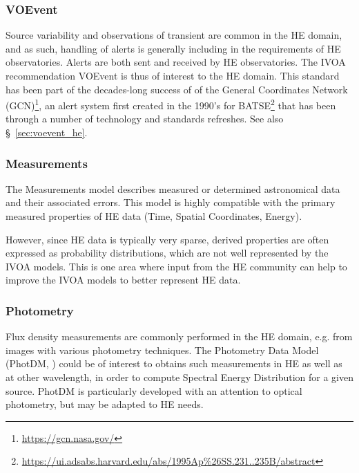 \documentclass[11pt,a4paper]{ivoa}
\begin{document}
{\subsubsection{VOEvent}

Source variability and observations of transient are common in the \gls{HE} domain, and as such, handling of alerts is generally including in the requirements of \gls{HE} observatories. Alerts are both sent and received by \gls{HE} observatories. The \gls{IVOA} recommendation VOEvent \citep{2017ivoa.spec.0320S} is thus of interest to the \gls{HE} domain.  This standard has been part of the decades-long success of of the General Coordinates Network (GCN)\footnote{\url{https://gcn.nasa.gov/}}, an alert system first created in the 1990's for BATSE\footnote{\url{https://ui.adsabs.harvard.edu/abs/1995Ap\%26SS.231..235B/abstract}} that has been through a number of technology and standards refreshes.  See also \S~\ref{sec:voevent_he}. 
 


\subsubsection{Measurements}

The Measurements model \citep{2022ivoa.spec.1004R} describes measured or determined astronomical data and their associated errors.
This model is highly compatible with the primary measured properties of \gls{HE} data (Time, Spatial Coordinates, Energy).

However, since \gls{HE} data is typically very sparse, derived properties are often expressed as probability distributions, which are not
well represented by the \gls{IVOA} models.  This is one area where input from the \gls{HE} community can help to improve the \gls{IVOA} models to better
represent \gls{HE} data.


\subsubsection{Photometry}

Flux density measurements are commonly performed in the \gls{HE} domain, e.g. from images with various photometry techniques. The Photometry Data Model (PhotDM, \citealt{2022ivoa.spec.1101S}) could be of interest to obtains such measurements in \gls{HE} as well as at other wavelength, in order to compute Spectral Energy Distribution for a given source. PhotDM is particularly developed with an attention to optical photometry, but may be adapted to \gls{HE} needs.

}
\end{document}
